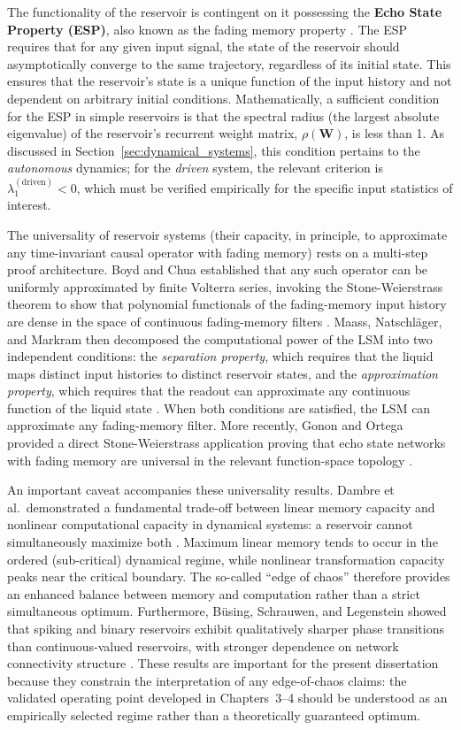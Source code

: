 The functionality of the reservoir is contingent on it possessing the \textbf{Echo State Property (ESP)}, also known as the fading memory property \cite{jaeger2001echo}. The ESP requires that for any given input signal, the state of the reservoir should asymptotically converge to the same trajectory, regardless of its initial state. This ensures that the reservoir's state is a unique function of the input history and not dependent on arbitrary initial conditions. Mathematically, a sufficient condition for the ESP in simple reservoirs is that the spectral radius (the largest absolute eigenvalue) of the reservoir's recurrent weight matrix, $\rho(\mathbf{W})$, is less than 1. As discussed in Section~\ref{sec:dynamical_systems}, this condition pertains to the \emph{autonomous} dynamics; for the \emph{driven} system, the relevant criterion is $\lambda_1^{(\text{driven})} < 0$, which must be verified empirically for the specific input statistics of interest.

The universality of reservoir systems (their capacity, in principle, to approximate any time-invariant causal operator with fading memory) rests on a multi-step proof architecture. Boyd and Chua established that any such operator can be uniformly approximated by finite Volterra series, invoking the Stone-Weierstrass theorem to show that polynomial functionals of the fading-memory input history are dense in the space of continuous fading-memory filters \cite{boyd_chua_1985}. Maass, Natschl\"{a}ger, and Markram then decomposed the computational power of the LSM into two independent conditions: the \emph{separation property}, which requires that the liquid maps distinct input histories to distinct reservoir states, and the \emph{approximation property}, which requires that the readout can approximate any continuous function of the liquid state \cite{Maass2002RealTime}. When both conditions are satisfied, the LSM can approximate any fading-memory filter. More recently, Gonon and Ortega provided a direct Stone-Weierstrass application proving that echo state networks with fading memory are universal in the relevant function-space topology \cite{gonon_ortega_2020}.

An important caveat accompanies these universality results. Dambre et al.\ demonstrated a fundamental trade-off between linear memory capacity and nonlinear computational capacity in dynamical systems: a reservoir cannot simultaneously maximize both \cite{dambre_2012}. Maximum linear memory tends to occur in the ordered (sub-critical) dynamical regime, while nonlinear transformation capacity peaks near the critical boundary. The so-called ``edge of chaos'' therefore provides an enhanced balance between memory and computation rather than a strict simultaneous optimum. Furthermore, B\"{u}sing, Schrauwen, and Legenstein showed that spiking and binary reservoirs exhibit qualitatively sharper phase transitions than continuous-valued reservoirs, with stronger dependence on network connectivity structure \cite{busing_2010}. These results are important for the present dissertation because they constrain the interpretation of any edge-of-chaos claims: the validated operating point developed in Chapters~3--4 should be understood as an empirically selected regime rather than a theoretically guaranteed optimum.

